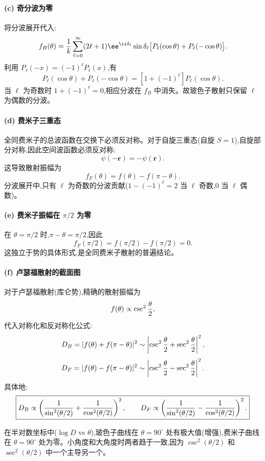 \begin{question}
\begin{solution}
\paragraph{(c) 奇分波为零}

将分波展开代入:
\[
f_B(\theta)={1\over k}\sum_{\ell=0}^{\infty}(2\ell+1)\ee^{\ii\delta_\ell}\sin\delta_\ell\bigl[P_\ell(\cos\theta)+P_\ell(-\cos\theta)\bigr].
\]
利用 $P_\ell(-x)=(-1)^\ell P_\ell(x)$,有
\[
P_\ell(\cos\theta)+P_\ell(-\cos\theta)=[1+(-1)^\ell]P_\ell(\cos\theta).
\]
当 $\ell$ 为奇数时 $1+(-1)^\ell=0$,相应分波在 $f_B$ 中消失。故玻色子散射只保留 $\ell$ 为偶数的分波。

\paragraph{(d) 费米子三重态}

全同费米子的总波函数在交换下必须反对称。对于自旋三重态(自旋 $S=1$),自旋部分对称,因此空间波函数必须反对称:
\[
\psi(-\mathbf r)=-\psi(\mathbf r).
\]
这导致散射振幅为
\[
\boxed{f_F(\theta)=f(\theta)-f(\pi-\theta).}
\]
分波展开中,只有 $\ell$ 为奇数的分波贡献($1-(-1)^\ell=2$ 当 $\ell$ 奇数,$0$ 当 $\ell$ 偶数)。

\paragraph{(e) 费米子振幅在 $\pi/2$ 为零}

在 $\theta=\pi/2$ 时,$\pi-\theta=\pi/2$,因此
\[
f_F(\pi/2)=f(\pi/2)-f(\pi/2)=0.
\]
这独立于势的具体形式,是全同费米子散射的普遍结论。

\paragraph{(f) 卢瑟福散射的截面图}

对于卢瑟福散射(库仑势),精确的散射振幅为
\[
f(\theta)\propto\csc^2{\theta\over2},
\]
代入对称化和反对称化公式:
\[
D_B=|f(\theta)+f(\pi-\theta)|^2\sim\left|\csc^2{\theta\over2}+\sec^2{\theta\over2}\right|^2,
\]
\[
D_F=|f(\theta)-f(\pi-\theta)|^2\sim\left|\csc^2{\theta\over2}-\sec^2{\theta\over2}\right|^2.
\]
具体地:
\[
\boxed{D_B\propto\left({1\over\sin^2(\theta/2)}+{1\over\cos^2(\theta/2)}\right)^2,
\qquad
D_F\propto\left({1\over\sin^2(\theta/2)}-{1\over\cos^2(\theta/2)}\right)^2.}
\]

在半对数坐标中($\log D$ vs $\theta$),玻色子曲线在 $\theta=90^\circ$ 处有极大值(增强),费米子曲线在 $\theta=90^\circ$ 处为零。小角度和大角度时两者趋于一致,因为 $\csc^2(\theta/2)$ 和 $\sec^2(\theta/2)$ 中一个主导另一个。
\end{solution}
\end{question}

